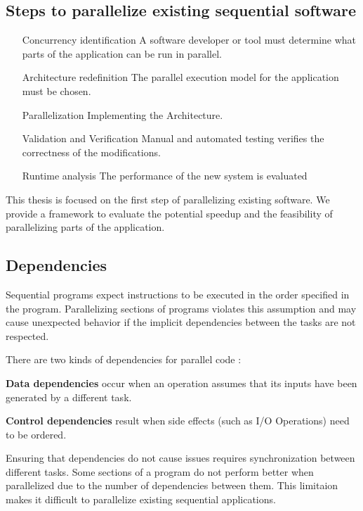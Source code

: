 \subsection{Steps to parallelize existing sequential software}

\begin{enumerate}[\hspace{80pt}(P1)]
	\item [Concurrency identification] A software developer or tool must determine what parts of the application can be run in parallel.
	\item [Architecture redefinition] The parallel execution model for the application must be chosen.
	\item [Parallelization] Implementing the Architecture.
	\item [Validation and Verification] Manual and automated testing verifies the correctness of the modifications.
	\item [Runtime analysis] The performance of the new system is evaluated
\end{enumerate}

This thesis is focused on the first step of parallelizing existing software. We provide a framework to evaluate the potential speedup and the feasibility of parallelizing parts of the application.

\subsection{Dependencies}

Sequential programs expect instructions to be executed in the order specified in the program. Parallelizing sections of programs violates this assumption and may cause unexpected behavior if the implicit dependencies between the tasks are not respected.

There are two kinds of dependencies for parallel code \cite{parbook}:

\textbf{Data dependencies} occur when an operation assumes that its inputs have been generated by a different task.

\textbf{Control dependencies} result when side effects (such as I/O Operations) need to be ordered.

Ensuring that dependencies do not cause issues requires synchronization between different tasks. Some sections of a program do not perform better when parallelized due to the number of dependencies between them. This limitaion makes it difficult to parallelize existing sequential applications.

